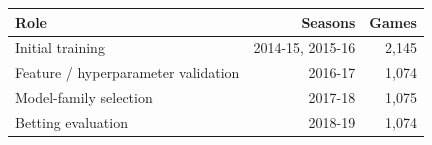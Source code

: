 \begin{tabularx}{\linewidth}{@{}Yrr@{}}
\toprule
Role & Seasons & Games \\

\midrule
Initial training & 2014-15, 2015-16 & 2,145 \\
Feature / hyperparameter validation & 2016-17 & 1,074 \\
Model-family selection & 2017-18 & 1,075 \\
Betting evaluation & 2018-19 & 1,074 \\
\bottomrule
\end{tabularx}
